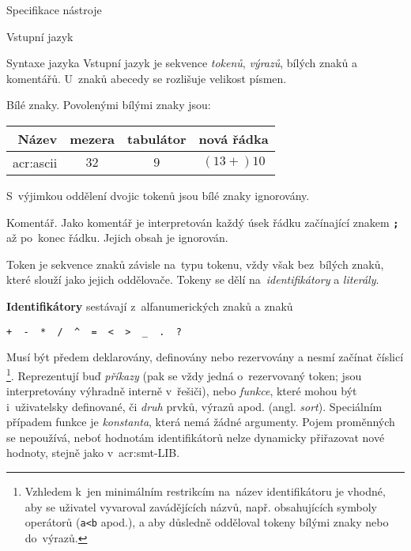 \documentclass[thesis=M,czech]{FITthesis}[2012/06/26]
\newcommand{\acrlabel}[1]{acr:#1}
\newcommand{\acr}[1]{\acrshort{\acrlabel{#1}}}
\newcommand{\id}[1]{\texttt{#1}}
\newcommand{\hl}[1]{\textit{#1}}
\newcommand{\hll}[1]{\textbf{#1}}
\newcommand{\name}[1]{\hl{#1}}
\begin{document}
\begin{section}{Specifikace nástroje}
\begin{subsection}{Vstupní jazyk}


\begin{subsubsection}{Syntaxe jazyka}\label{sss:design:spec:ilang:syntax}
Vstupní jazyk je sekvence \name{tokenů}, \name{výrazů},
bílých znaků a komentářů.
U~znaků abecedy se rozlišuje velikost písmen.


\begin{paragraph}{Bílé znaky.}\label{p:design:spec:ilang:struct:ws}
Povolenými bílými znaky jsou:
\begin{center}
\begin{tabular}{r|ccc}
   Název       & mezera & tabulátor & nová řádka \\ \hline
   \acr{ascii} &   $32$ &       $9$ &  $(13+{})10$ \\
\end{tabular}
\end{center}

S~výjimkou oddělení dvojic tokenů jsou bílé znaky ignorovány.
\end{paragraph} %


\begin{paragraph}{Komentář.}\label{p:design:spec:ilang:struct:cmt}
Jako komentář je interpretován každý úsek řádku
začínající znakem \hll{\id{;}} až po~konec řádku.
Jejich obsah je ignorován.
\end{paragraph} %


\begin{paragraph}{Token}\label{p:design:spec:ilang:struct:token}
je sekvence znaků závisle na~typu tokenu,
vždy však bez~bílých znaků, které slouží jako jejich oddělovače.
Tokeny se dělí na~\name{identifikátory} a \name{literály}.

\hll{Identifikátory} sestávají z~alfanumerických znaků a znaků
\begin{center}
\id{+ \  - \  * \  / \  \^{} \  = \  < \  > \  \_ \  . \  ?}
\end{center}
Musí být předem deklarovány, definovány nebo rezervovány
a nesmí začínat číslicí%
\footnote{Vzhledem k~jen minimálním restrikcím na~název identifikátoru
je vhodné, aby se uživatel vyvaroval zavádějících názvů,
např. obsahujících symboly operátorů
(\id{a<b} apod.),
a aby důsledně odděloval tokeny bílými znaky
nebo do~výrazů.}.
Reprezentují buď \name{příkazy}
(pak se vždy jedná o~rezervovaný token;
jsou interpretovány výhradně interně v~řešiči),
nebo \name{funkce},
které mohou být i~uživatelsky definované,
či \name{druh} prvků, výrazů apod. (angl. \name{sort}).
Speciálním případem funkce je \name{konstanta},
která nemá žádné argumenty.
Pojem proměnných se nepoužívá,
neboť hodnotám identifikátorů nelze dynamicky přiřazovat nové hodnoty,
stejně jako v~\acr{smt}-LIB.


\end{paragraph}
\end{subsubsection}
\end{subsection}
\end{section}
\end{document}
